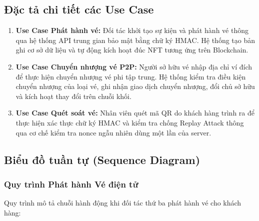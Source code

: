 \documentclass[a4paper]{report}
\begin{document}
\subsection{Đặc tả chi tiết các Use Case}
\begin{enumerate}
    \item \textbf{Use Case Phát hành vé:} Đối tác khởi tạo sự kiện và phát hành vé thông qua hệ thống API trung gian bảo mật bằng chữ ký HMAC. Hệ thống tạo bản ghi cơ sở dữ liệu và tự động kích hoạt đúc NFT tương ứng trên Blockchain.
    \item \textbf{Use Case Chuyển nhượng vé P2P:} Người sở hữu vé nhập địa chỉ ví đích để thực hiện chuyển nhượng vé phi tập trung. Hệ thống kiểm tra điều kiện chuyển nhượng của loại vé, ghi nhận giao dịch chuyển nhượng, đổi chủ sở hữu và kích hoạt thay đổi trên chuỗi khối.
    \item \textbf{Use Case Quét soát vé:} Nhân viên quét mã QR do khách hàng trình ra để thực hiện xác thực chữ ký HMAC và kiểm tra chống Replay Attack thông qua cơ chế kiểm tra nonce ngẫu nhiên dùng một lần của server.
\end{enumerate}

\subsection{Biểu đồ tuần tự (Sequence Diagram)}

\subsubsection{Quy trình Phát hành Vé điện tử}
Quy trình mô tả chuỗi hành động khi đối tác thứ ba phát hành vé cho khách hàng:
\end{document}
